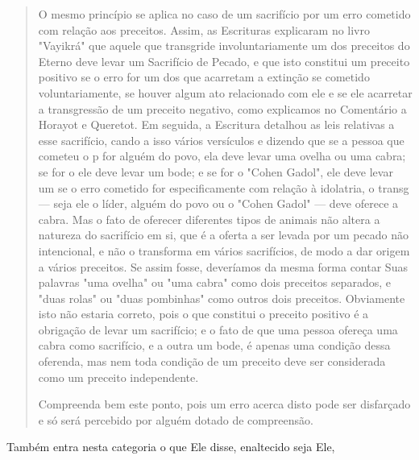 \begin{quote}
O mesmo princípio se aplica no caso de um sacrifício por um erro
cometido com relação aos preceitos. Assim, as Escrituras explicaram no
livro "Vayikrá" que aquele que transgride involuntariamente um dos
preceitos do Eterno deve levar um Sacrifício de Pecado, e que isto
constitui um preceito positivo se o erro for um dos que acarretam a
extinção se cometido voluntaria­mente, se houver algum ato relacionado
com ele e se ele acarretar a transgres­são de um preceito negativo, como
explicamos no Comentário a Horayot e Que­retot. Em seguida, a Escritura
detalhou as leis relativas a esse sacrifício, cando a isso vários
versículos e dizendo que se a pessoa que cometeu o p for alguém do povo,
ela deve levar uma ovelha ou uma cabra; se for o ele deve levar um bode;
e se for o "Cohen Gadol", ele deve levar um se o erro cometido for
especificamente com relação à idolatria, o transg --- seja ele o líder,
alguém do povo ou o "Cohen Gadol" --- deve oferece a cabra. Mas o fato
de oferecer diferentes tipos de animais não altera a natureza do
sacrifício em si, que é a oferta a ser levada por um pecado não
intencional, e não o transforma em vários sacrifícios, de modo a dar
origem a vários precei­tos. Se assim fosse, deveríamos da mesma forma
contar Suas palavras "uma ove­lha" ou "uma cabra" como dois preceitos
separados, e "duas rolas" ou "duas pombinhas" como outros dois
preceitos. Obviamente isto não estaria correto, pois o que constitui o
preceito positivo é a obrigação de levar um sacrifício; e o fato de que
uma pessoa ofereça uma cabra como sacrifício, e a outra um bode, é
apenas uma condição dessa oferenda, mas nem toda condição de um preceito
deve ser considerada como um preceito independente.

Compreenda bem este ponto, pois um erro acerca disto pode ser disfarçado
e só será percebido por alguém dotado de compreensão.
\end{quote}

Também entra nesta categoria o que Ele disse, enaltecido seja Ele,


